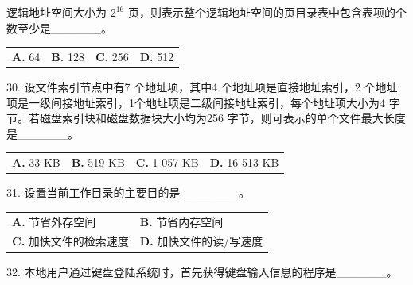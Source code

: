 \documentclass[UTF8,11pt]{ctexart}
\begin{document}
逻辑地址空间大小为 \(\displaystyle 2^{16}\) 页，则表示整个逻辑地址空间的页目录表中包含表项的个数至少是\_\_\_\_\_\_。


\begin{center}\begin{tabular}{>{\raggedright\arraybackslash}p{\dimexpr(\linewidth-8\tabcolsep)/4\relax}>{\raggedright\arraybackslash}p{\dimexpr(\linewidth-8\tabcolsep)/4\relax}>{\raggedright\arraybackslash}p{\dimexpr(\linewidth-8\tabcolsep)/4\relax}>{\raggedright\arraybackslash}p{\dimexpr(\linewidth-8\tabcolsep)/4\relax}}
\textbf{A.} 64 & \textbf{B.} 128 & \textbf{C.} 256 & \textbf{D.} 512\\[.35em]\end{tabular}\end{center}

30. 设文件索引节点中有7 个地址项，其中4 个地址项是直接地址索引，2 个地址项是一级间接地址索引，1个地址项是二级间接地址索引，每个地址项大小为4 字节。若磁盘索引块和磁盘数据块大小均为256 字节，则可表示的单个文件最大长度是\_\_\_\_\_\_。


\begin{center}\begin{tabular}{>{\raggedright\arraybackslash}p{\dimexpr(\linewidth-8\tabcolsep)/4\relax}>{\raggedright\arraybackslash}p{\dimexpr(\linewidth-8\tabcolsep)/4\relax}>{\raggedright\arraybackslash}p{\dimexpr(\linewidth-8\tabcolsep)/4\relax}>{\raggedright\arraybackslash}p{\dimexpr(\linewidth-8\tabcolsep)/4\relax}}
\textbf{A.} 33 KB & \textbf{B.} 519 KB & \textbf{C.} 1 057 KB & \textbf{D.} 16 513 KB\\[.35em]\end{tabular}\end{center}

31. 设置当前工作目录的主要目的是\_\_\_\_\_\_\_。


\begin{center}\begin{tabular}{>{\raggedright\arraybackslash}p{\dimexpr(\linewidth-4\tabcolsep)/2\relax}>{\raggedright\arraybackslash}p{\dimexpr(\linewidth-4\tabcolsep)/2\relax}}
\textbf{A.} 节省外存空间 & \textbf{B.} 节省内存空间\\[.35em]
\textbf{C.} 加快文件的检索速度 & \textbf{D.} 加快文件的读/写速度\\[.35em]\end{tabular}\end{center}

32. 本地用户通过键盘登陆系统时，首先获得键盘输入信息的程序是\_\_\_\_\_\_。
\end{document}
